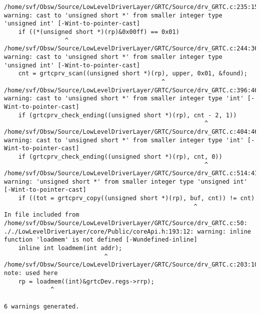 
\noindent\begin{minipage}{\textwidth}
\begin{lstlisting}[language={}, caption=8th warning example., label=srciror_8]
/home/svf/Obsw/Source/LowLevelDriverLayer/GRTC/Source/drv_GRTC.c:235:15: warning: cast to 'unsigned short *' from smaller integer type 'unsigned int' [-Wint-to-pointer-cast]
	if ((*(unsigned short *)(rp)&0x00ff) == 0x01) 
				 ^
/home/svf/Obsw/Source/LowLevelDriverLayer/GRTC/Source/drv_GRTC.c:244:36: warning: cast to 'unsigned short *' from smaller integer type 'unsigned int' [-Wint-to-pointer-cast]
	cnt = grtcprv_scan((unsigned short *)(rp), upper, 0x01, &found); 
											^			
/home/svf/Obsw/Source/LowLevelDriverLayer/GRTC/Source/drv_GRTC.c:396:46: warning: cast to 'unsigned short *' from smaller integer type 'int' [-Wint-to-pointer-cast]
	if (grtcprv_check_ending((unsigned short *)(rp), cnt - 2, 1)) 
														^
/home/svf/Obsw/Source/LowLevelDriverLayer/GRTC/Source/drv_GRTC.c:404:46: warning: cast to 'unsigned short *' from smaller integer type 'int' [-Wint-to-pointer-cast]
	if (grtcprv_check_ending((unsigned short *)(rp), cnt, 0)) 
														^
/home/svf/Obsw/Source/LowLevelDriverLayer/GRTC/Source/drv_GRTC.c:514:41: warning: 'unsigned short *' from smaller integer type 'unsigned int' [-Wint-to-pointer-cast]
	if ((tot = grtcprv_copy((unsigned short *)(rp), buf, cnt)) != cnt) 
													 ^
In file included from /home/svf/Obsw/Source/LowLevelDriverLayer/GRTC/Source/drv_GRTC.c:50: ././LowLevelDriverLayer/core/Public/coreApi.h:193:12: warning: inline function 'loadmem' is not defined [-Wundefined-inline]
	inline int loadmem(int addr);
							^
/home/svf/Obsw/Source/LowLevelDriverLayer/GRTC/Source/drv_GRTC.c:203:10: note: used here
	rp = loadmem((int)&grtcDev.regs->rrp); 
			 ^

6 warnings generated.
\end{lstlisting}
\end{minipage}